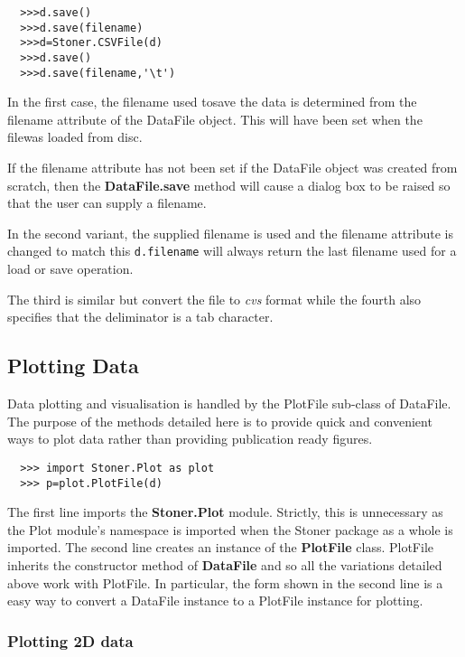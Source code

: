 \documentclass[a4paper,11pt]{scrartcl}
\begin{document}
\begin{verbatim}
  >>>d.save()
  >>>d.save(filename)
  >>>d=Stoner.CSVFile(d)
  >>>d.save()
  >>>d.save(filename,'\t')
\end{verbatim}

In the first case, the filename used tosave the data is determined from the
filename attribute of the DataFile object. This will have been set when the
filewas loaded from disc.

If the filename attribute has not been set \eg if the DataFile object was
created from scratch, then the \textbf{DataFile.save} method will cause a dialog
box to be raised so that the user can supply a filename.

In the second variant, the supplied filename is used and the filename attribute
is changed to match this \ie \verb#d.filename# will always return the last
filename used for a load or save operation.

The third is similar but convert the file to \textit{cvs} format while the fourth also specifies that the deliminator is a tab character.

\subsection{Plotting Data}

Data plotting and visualisation is handled by the PlotFile sub-class of DataFile. The purpose of the methods detailed here is to provide quick and convenient ways to plot data rather than providing publication ready figures.

\begin{verbatim}
  >>> import Stoner.Plot as plot
  >>> p=plot.PlotFile(d)
\end{verbatim}

The first line imports the \textbf{Stoner.Plot} module. Strictly, this is unnecessary as the Plot module's namespace is imported when the Stoner package as a whole is imported. The second line creates an instance of the \textbf{PlotFile} class. PlotFile inherits the constructor method of \textbf{DataFile} and so all the variations detailed above work with PlotFile. In particular, the form shown in the second line is a easy way to convert a DataFile instance to a PlotFile instance for plotting.

\subsubsection{Plotting 2D data}
\end{document}

